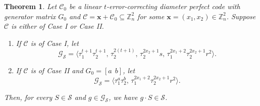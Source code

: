 \documentclass{article}
\newtheorem{theorem}{Theorem}[section]
\theoremstyle{definition}
\begin{document}
\begin{theorem}
Let $\mathcal{C}_0$ be a linear $t$-error-correcting diameter perfect code with generator matrix $G_0$ and $\mathcal{C}=\mathbf{x}+\mathcal{C}_0\subseteq\mathbb{Z}_n^2$ for some $\mathbf{x}=(x_1, x_2)\in\mathbb{Z}_n^2$. Suppose $\mathcal{C}$ is either of Case I or Case II.
	\begin{enumerate}
	\item[(i)] If $\mathcal{C}$ is of Case I, let
	\[
	\mathcal{G}_\mathcal{S}=\langle \tau_1^{t+1}\tau_2^{t+1},\, \tau_2^{2(t+1)},\,\tau_2^{2x_2+1}s,\, \tau_1^{2x_1+2}\tau_2^{2x_2+1}r^2\rangle.
	\]
	\item[(ii)] If $\mathcal{C}$ is of Case II and $G_0=[a~~b]$, let
	\[
	\mathcal{G}_\mathcal{S}=\langle \tau_1^{a}\tau_2^{b},\, \tau_1^{2x_1+2}\tau_2^{2x_2+1}r^2\rangle.
	\]
	\end{enumerate}
	Then, for every $S\in \mathcal{S}$ and $g\in \mathcal{G}_\mathcal{S}$, we have $g\cdot S\in \mathcal{S}$.
\end{theorem}
\end{document}
